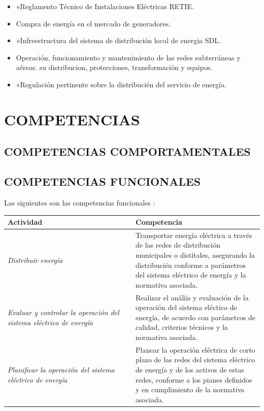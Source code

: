 \documentclass[a5paper]{book}%
\begin{document}
\begin{itemize}
\item «Reglamento Técnico de Instalaciones Eléctricas RETIE.
\item Compra de energía en el mercado de generadores.
\item «Infreestructura del sistema de distribución local de energia SDL.
\item Operación, funcionamiento y mantenimiento de las redes subterráneas y aéreas.
 su distribucion, protecciones, transformación y equipos.
\item «Regulación pertinente sobre la distribucién del servicio de energía.
\end{itemize}

  \section{COMPETENCIAS}

  \subsection{COMPETENCIAS COMPORTAMENTALES}

  \subsection{COMPETENCIAS FUNCIONALES}

  Las siguientes son las competencias funcionales :\\
  
  \begin{table}[H]
    \begin{tabular}{|p{0.5\linewidth}|p{0.5\linewidth}|}
      \hline
      \textbf{Actividad} &  \textbf{Competencia} \\\hline
      \textit{Distribuir energía} & Transportar energía eléctrica a través de las redes de distribución municipales o distitales, asegurando la distribucién conforme a parámetros del sistema eléctrico de energía    y la normativa asociada.\\\hline
      \textit{Evaluar y controlar la operación del sistema eléctrico de energía} &  Realizar el análiis y evaluación de la operación del sistema eléctico de energía, de acuerdo con parámetros de calidad, criterios técnicos y la normativa asociada. \\\hline
      \textit{Planificar la operación del sistema eléctrico de energía} & Planear la operación eléctrica de corto plazo de las redes del sistema eléctrico de energía y de los activos de  estas redes, conforme a los pianes definidos y en cumplimiento de la normativa asociada.\\\hline
    \end{tabular}
    \end{table}
\end{document}
